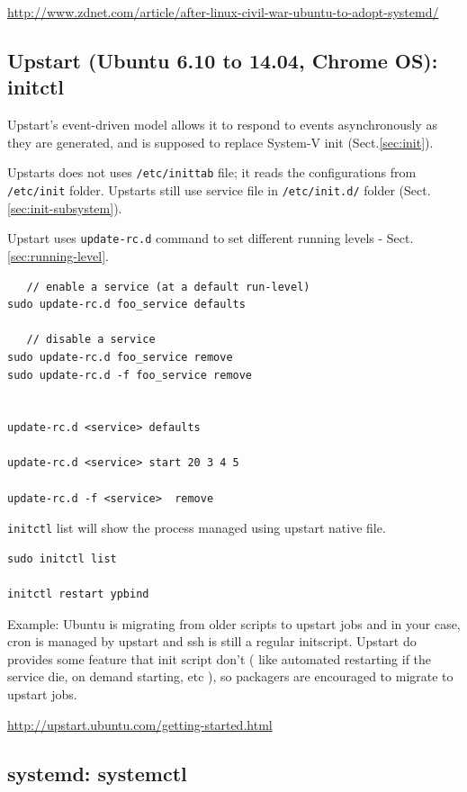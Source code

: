\url{http://www.zdnet.com/article/after-linux-civil-war-ubuntu-to-adopt-systemd/}


\subsection{Upstart (Ubuntu 6.10 to 14.04, Chrome OS): initctl}
\label{sec:Upstart}
\label{sec:update-rc.d}
\label{sec:initctl}

Upstart's event-driven model allows it to respond to events asynchronously as
they are generated, and is supposed to replace System-V init
(Sect.\ref{sec:init}).

Upstarts does not uses \verb!/etc/inittab! file; it reads the configurations
from \verb!/etc/init! folder. Upstarts still use service file in
\verb!/etc/init.d/! folder (Sect.\ref{sec:init-subsystem}).

Upstart uses \verb!update-rc.d! command to set different running levels
- Sect.\ref{sec:running-level}.

\begin{verbatim}
   // enable a service (at a default run-level)
sudo update-rc.d foo_service defaults

   // disable a service
sudo update-rc.d foo_service remove
sudo update-rc.d -f foo_service remove


update-rc.d <service> defaults

update-rc.d <service> start 20 3 4 5

update-rc.d -f <service>  remove
\end{verbatim}

\verb!initctl! list will show the process managed using upstart native file.
\begin{verbatim}
sudo initctl list

initctl restart ypbind
\end{verbatim}

Example: Ubuntu is migrating from older scripts to upstart jobs and in your
case, cron is managed by upstart and ssh is still a regular initscript. Upstart
do provides some feature that init script don't ( like automated restarting if
the service die, on demand starting, etc ), so packagers are encouraged to
migrate to upstart jobs.


\url{http://upstart.ubuntu.com/getting-started.html}


\subsection{systemd: systemctl}
\label{sec:systemd}

